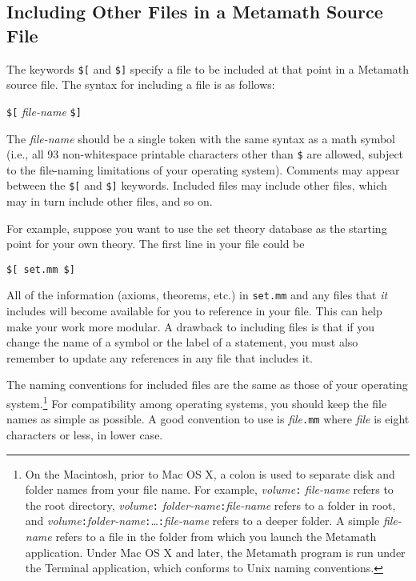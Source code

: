 \subsection{Including Other Files in a Metamath Source File} \label{include}

The keywords \texttt{\$[} and \texttt{\$]} specify a file to be
included at that point in a
Metamath source file.  The syntax for
including a file is as follows:
\begin{center}
\texttt{\$[} {\em file-name} \texttt{\$]}
\end{center}

The {\em file-name} should be a single token with the same syntax
as a math symbol (i.e., all 93 non-whitespace
printable characters other than \texttt{\$} are
allowed, subject to the file-naming limitations of your operating system).
Comments may appear between the \texttt{\$[} and \texttt{\$]} keywords.  Included
files may include other files, which may in turn include other files, and so
on.

For example, suppose you want to use the set theory database as the starting
point for your own theory.  The first line in your file could be
\begin{center}
\texttt{\$[ set.mm \$]}
\end{center} All of the information (axioms, theorems,
etc.) in \texttt{set.mm} and any files that {\em it} includes will become
available for you to reference in your file. This can help make your work more
modular. A drawback to including files is that if you change the name of a
symbol or the label of a statement, you must also remember to update any
references in any file that includes it.


The naming conventions for included files are the same as those of your
operating system.\footnote{On the Macintosh, prior to Mac OS X,
 a colon is used to separate disk
and folder names from your file name.  For example, {\em volume}\texttt{:}{\em
file-name} refers to the root directory, {\em volume}\texttt{:}{\em
folder-name}\texttt{:}{\em file-name} refers to a folder in root, and {\em
volume}\texttt{:}{\em folder-name}\texttt{:}\ldots\texttt{:}{\em file-name} refers to a
deeper folder.  A simple {\em file-name} refers to a file in the folder from
which you launch the Metamath application.  Under Mac OS X and later,
the Metamath program is run under the Terminal application, which
conforms to Unix naming conventions.}\label{includef} For compatibility among
operating systems, you should keep the file names as simple as possible.  A
good convention to use is {\em file}\texttt{.mm} where {\em file} is eight
characters or less, in lower case.

